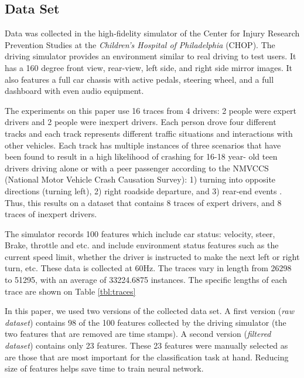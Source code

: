 \documentclass[draft,dvipsnames]{drexel-thesis}
\begin{document}
\begin{thesis}
\chapter{Data Set}

Data was collected in the high-fidelity simulator \cite{lee2017learning} of the Center for Injury Research Prevention Studies at the \textit{Children's Hospital of Philadelphia} (CHOP). The driving simulator provides an environment similar to real driving to test users. It has a 160 degree front view, rear-view, left side, and right side mirror images. It also features a full car chassis with active pedals, steering wheel, and a full dashboard with even audio equipment.

The experiments on this paper use 16 traces from 4 drivers: 2 people were expert drivers and 2 people were inexpert drivers. Each person drove four different tracks and each track represents different traffic situations and interactions with other vehicles. Each track has multiple instances of three scenarios that have been found to result in a high likelihood of crashing for 16-18 year- old teen drivers driving alone or with a peer passenger according to the NMVCCS (National Motor Vehicle Crash Causation Survey): 1) turning into opposite directions (turning left), 2) right roadside departure, and 3) rear-end events \cite{mcdonald2012using}. Thus, this results on a dataset that contains 8 traces of expert drivers, and 8 traces of inexpert drivers.

The simulator records 100 features which include car status: velocity, steer, Brake, throttle and etc. and include environment status features such as the current speed limit, whether the driver is instructed to make the next left or right turn, etc. These data is collected at 60Hz. The traces vary in length from 26298 to 51295, with an average of 33224.6875 instances. The specific lengths of each trace are shown on Table \ref{tbl:traces}

In this paper, we used two versions of the collected data set. A first version ({\em raw dataset}) contains 98 of the 100 features collected by the driving simulator (the two features that are removed are time stamps). A second version ({\em filtered dataset}) contains only 23 features. These 23 features were manually selected as are those that are most important for the classification task at hand. Reducing size of features helps save time to train neural network.


\end{thesis}
\end{document}

